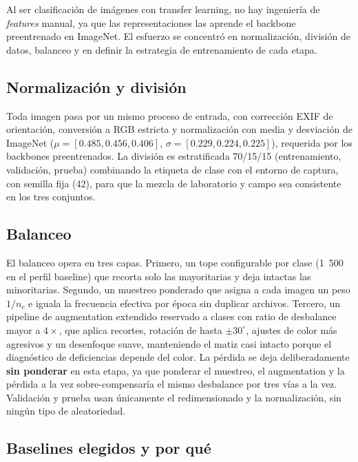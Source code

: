 \documentclass[12pt,letterpaper]{article}
\begin{document}
Al ser clasificaci\'on de im\'agenes con transfer learning, no hay ingenier\'ia de \textit{features} manual, ya que las representaciones las aprende el backbone preentrenado en ImageNet. El esfuerzo se concentr\'o en normalizaci\'on, divisi\'on de datos, balanceo y en definir la estrategia de entrenamiento de cada etapa.

\subsection{Normalizaci\'on y divisi\'on}

Toda imagen pasa por un mismo proceso de entrada, con correcci\'on EXIF de orientaci\'on, conversi\'on a RGB estricta y normalizaci\'on con media y desviaci\'on de ImageNet ($\mu=[0.485,0.456,0.406]$, $\sigma=[0.229,0.224,0.225]$), requerida por los backbones preentrenados. La divisi\'on es estratificada 70/15/15 (entrenamiento, validaci\'on, prueba) combinando la etiqueta de clase con el entorno de captura, con semilla fija (42), para que la mezcla de laboratorio y campo sea consistente en los tres conjuntos.

\subsection{Balanceo}
\label{sec:balanceo}

El balanceo opera en tres capas. Primero, un tope configurable por clase (1~500 en el perfil baseline) que recorta solo las mayoritarias y deja intactas las minoritarias. Segundo, un muestreo ponderado que asigna a cada imagen un peso $1/n_c$ e iguala la frecuencia efectiva por \'epoca sin duplicar archivos. Tercero, un pipeline de augmentation extendido reservado a clases con ratio de desbalance mayor a $4\times$, que aplica recortes, rotaci\'on de hasta $\pm30^\circ$, ajustes de color m\'as agresivos y un desenfoque suave, manteniendo el matiz casi intacto porque el diagn\'ostico de deficiencias depende del color. La p\'erdida se deja deliberadamente \textbf{sin ponderar} en esta etapa, ya que ponderar el muestreo, el augmentation y la p\'erdida a la vez sobre-compensar\'ia el mismo desbalance por tres v\'ias a la vez. Validaci\'on y prueba usan \'unicamente el redimensionado y la normalizaci\'on, sin ning\'un tipo de aleatoriedad.

\subsection{Baselines elegidos y por qu\'e}
\end{document}
